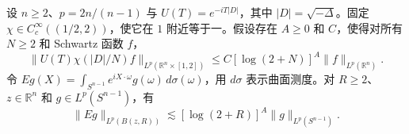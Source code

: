 设 \(n\ge2\)、\(p=2n/(n-1)\) 与 \(U(T)=e^{-iT|D|}\)，其中 \(|D|=\sqrt{-\Delta}\)。固定 \(\chi\in C^\infty_c((1/2,2))\)，使它在 \(1\) 附近等于一。假设存在 \(A\ge0\) 和 \(C\)，使得对所有 \(N\ge2\) 和 Schwartz 函数 \(f\)，
\[
 \|U(T)\chi(|D|/N)f\|_{L^p(\mathbb R^n\times[1,2])}
 \le C[\log(2+N)]^{A}\|f\|_{L^p(\mathbb R^n)}.
\]
令 \(Eg(X)=\int_{S^{n-1}}e^{iX\cdot\omega}g(\omega)\,d\sigma(\omega)\)，用 \(d\sigma\) 表示曲面测度。对 \(R\ge2\)、\(z\in\mathbb R^n\) 和 \(g\in L^p(S^{n-1})\)，有
\[
 \|Eg\|_{L^p(B(z,R))}\lesssim [\log(2+R)]^A\|g\|_{L^p(S^{n-1})}.
\]

